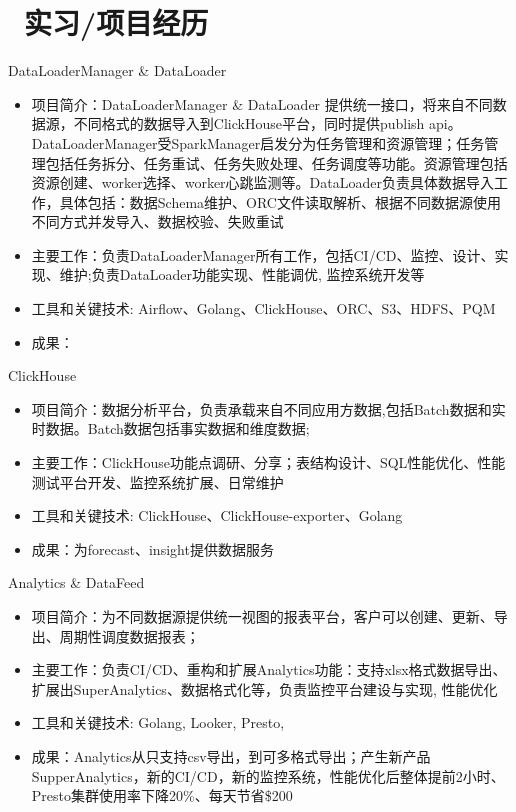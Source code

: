 \documentclass{resume}
\begin{document}
\section{\faUsers\ 实习/项目经历}
DataLoaderManager \& DataLoader
\begin{itemize}
  \item 项目简介：DataLoaderManager \& DataLoader 提供统一接口，将来自不同数据源，不同格式的数据导入到ClickHouse平台，同时提供publish api。DataLoaderManager受SparkManager启发分为任务管理和资源管理；任务管理包括任务拆分、任务重试、任务失败处理、任务调度等功能。资源管理包括资源创建、worker选择、worker心跳监测等。DataLoader负责具体数据导入工作，具体包括：数据Schema维护、ORC文件读取解析、根据不同数据源使用不同方式并发导入、数据校验、失败重试
  \item 主要工作：负责DataLoaderManager所有工作，包括CI/CD、监控、设计、实现、维护;负责DataLoader功能实现、性能调优, 监控系统开发等
  \item 工具和关键技术: Airflow、Golang、ClickHouse、ORC、S3、HDFS、PQM
  \item 成果：
\end{itemize}
ClickHouse
\begin{itemize}
  \item 项目简介：数据分析平台，负责承载来自不同应用方数据,包括Batch数据和实时数据。Batch数据包括事实数据和维度数据;
  \item 主要工作：ClickHouse功能点调研、分享；表结构设计、SQL性能优化、性能测试平台开发、监控系统扩展、日常维护
  \item 工具和关键技术: ClickHouse、ClickHouse-exporter、Golang
  \item 成果：为forecast、insight提供数据服务
\end{itemize}
Analytics \& DataFeed
\begin{itemize}
  \item 项目简介：为不同数据源提供统一视图的报表平台，客户可以创建、更新、导出、周期性调度数据报表；
  \item 主要工作：负责CI/CD、重构和扩展Analytics功能：支持xlsx格式数据导出、扩展出SuperAnalytics、数据格式化等，负责监控平台建设与实现, 性能优化
  \item 工具和关键技术: Golang, Looker, Presto, 
  \item 成果：Analytics从只支持csv导出，到可多格式导出；产生新产品SupperAnalytics，新的CI/CD，新的监控系统，性能优化后整体提前2小时、Presto集群使用率下降20\%、每天节省\$200
\end{itemize}
\end{document}
